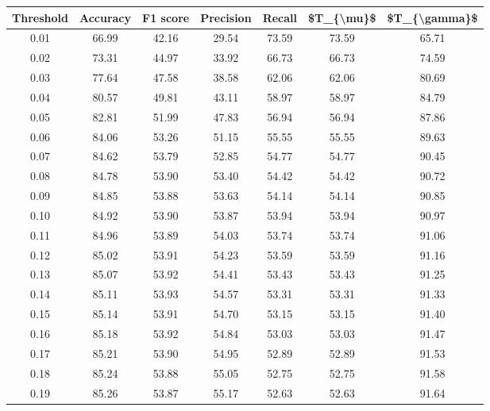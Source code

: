 \begin{tabular}{|c|c|c|c|c|c|c|}
\toprule
 Threshold &  Accuracy &  F1 score &  Precision &  Recall &  \$T\_\{\textbackslash mu\}\$ &  \$T\_\{\textbackslash gamma\}\$ \\
\hline
      0.01 &     66.99 &     42.16 &      29.54 &   73.59 &      73.59 &         65.71 \\
      0.02 &     73.31 &     44.97 &      33.92 &   66.73 &      66.73 &         74.59 \\
      0.03 &     77.64 &     47.58 &      38.58 &   62.06 &      62.06 &         80.69 \\
      0.04 &     80.57 &     49.81 &      43.11 &   58.97 &      58.97 &         84.79 \\
      0.05 &     82.81 &     51.99 &      47.83 &   56.94 &      56.94 &         87.86 \\
      0.06 &     84.06 &     53.26 &      51.15 &   55.55 &      55.55 &         89.63 \\
      0.07 &     84.62 &     53.79 &      52.85 &   54.77 &      54.77 &         90.45 \\
      0.08 &     84.78 &     53.90 &      53.40 &   54.42 &      54.42 &         90.72 \\
      0.09 &     84.85 &     53.88 &      53.63 &   54.14 &      54.14 &         90.85 \\
      0.10 &     84.92 &     53.90 &      53.87 &   53.94 &      53.94 &         90.97 \\
      0.11 &     84.96 &     53.89 &      54.03 &   53.74 &      53.74 &         91.06 \\
      0.12 &     85.02 &     53.91 &      54.23 &   53.59 &      53.59 &         91.16 \\
      0.13 &     85.07 &     53.92 &      54.41 &   53.43 &      53.43 &         91.25 \\
      0.14 &     85.11 &     53.93 &      54.57 &   53.31 &      53.31 &         91.33 \\
      0.15 &     85.14 &     53.91 &      54.70 &   53.15 &      53.15 &         91.40 \\
      0.16 &     85.18 &     53.92 &      54.84 &   53.03 &      53.03 &         91.47 \\
      0.17 &     85.21 &     53.90 &      54.95 &   52.89 &      52.89 &         91.53 \\
      0.18 &     85.24 &     53.88 &      55.05 &   52.75 &      52.75 &         91.58 \\
      0.19 &     85.26 &     53.87 &      55.17 &   52.63 &      52.63 &         91.64 \\

\end{tabular}
